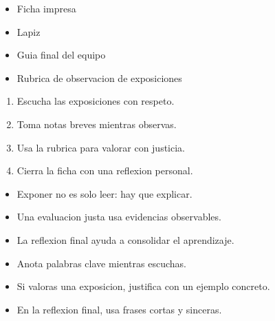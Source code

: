\documentclass[12pt,a4paper]{article}
\begin{document}
        \FichaCabecera

        \begin{materialesbox}
        \begin{itemize}
    \item Ficha impresa
    \item Lapiz
    \item Guia final del equipo
    \item Rubrica de observacion de exposiciones
\end{itemize}
        \end{materialesbox}

        \begin{pasosbox}
        \begin{enumerate}
    \item Escucha las exposiciones con respeto.
    \item Toma notas breves mientras observas.
    \item Usa la rubrica para valorar con justicia.
    \item Cierra la ficha con una reflexion personal.
\end{enumerate}
        \end{pasosbox}

        \begin{recordatoriobox}
        \begin{itemize}
    \item Exponer no es solo leer: hay que explicar.
    \item Una evaluacion justa usa evidencias observables.
    \item La reflexion final ayuda a consolidar el aprendizaje.
\end{itemize}
        \end{recordatoriobox}

        \begin{apoyobox}
        \begin{itemize}
    \item Anota palabras clave mientras escuchas.
    \item Si valoras una exposicion, justifica con un ejemplo concreto.
    \item En la reflexion final, usa frases cortas y sinceras.
\end{itemize}
        \end{apoyobox}


\end{document}
